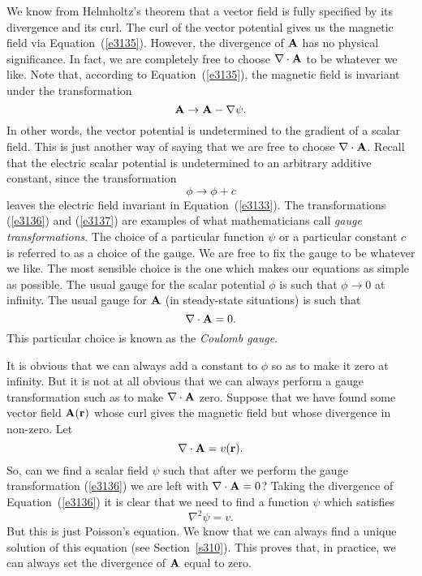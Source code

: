 We know from Helmholtz's theorem that a vector field is fully specified by
its divergence and its curl. The curl of the vector potential gives us the magnetic
field via Equation~(\ref{e3135}). However, the divergence of ${\bf A}$ has no physical
significance. In fact, we are completely free to choose $\nabla\cdot{\bf A}$ to
be whatever we like. Note that, according to Equation~(\ref{e3135}), the magnetic field
is invariant under the transformation 
\begin{equation}
{\bf A} \rightarrow {\bf A} - \nabla\psi.\label{e3136}
\end{equation}
In other words, the vector potential is undetermined to the gradient of a scalar 
field. This is just another way of saying that we are free to choose $\nabla\cdot
{\bf A}$. Recall that the electric scalar potential is undetermined to an
arbitrary additive constant, since the transformation
\begin{equation}
\phi \rightarrow \phi + c\label{e3137}
\end{equation}
leaves the electric field invariant in Equation~(\ref{e3133}). The transformations (\ref{e3136})
and (\ref{e3137}) are examples of what mathematicians call  {\em gauge transformations}.
The choice of a particular function $\psi$ or a particular constant $c$ is
referred to as a choice of the 
gauge. We are free to fix the gauge to be whatever we
like. The most sensible choice is the one which makes our equations as simple
as possible. The usual gauge for the scalar potential $\phi$ is such
that $\phi\rightarrow 0$ at infinity. The usual gauge for ${\bf A}$
(in steady-state situations) is such that
\begin{equation}\label{e3138}
\nabla\cdot{\bf A} = 0.
\end{equation}
This particular choice is known as the {\em Coulomb gauge}.

It is obvious that we can always add a constant to $\phi$ so as to make
it zero at infinity. But it is not at all obvious that we can always
perform a gauge transformation such as to make $\nabla\cdot{\bf A}$ zero.
Suppose that we have found some vector field ${\bf A}({\bf r})$ whose curl gives the
magnetic field but whose divergence in non-zero. Let
\begin{equation}
\nabla \cdot{\bf A} = v({\bf r}).
\end{equation}
So, can we find a scalar field $\psi$ such that after we perform the
gauge transformation (\ref{e3136}) we are left with $\nabla\cdot{\bf A} = 0$? Taking
the divergence of Equation~(\ref{e3136}) it is clear that we need to find a
function  $\psi$ which
satisfies
\begin{equation}
\nabla^2\psi = v.
\end{equation}
But this is just Poisson's equation. We know that we can always find a
unique solution of this equation (see Section~\ref{s310}). This proves that, in practice,
we can always set the divergence of ${\bf A}$ equal to zero. 

